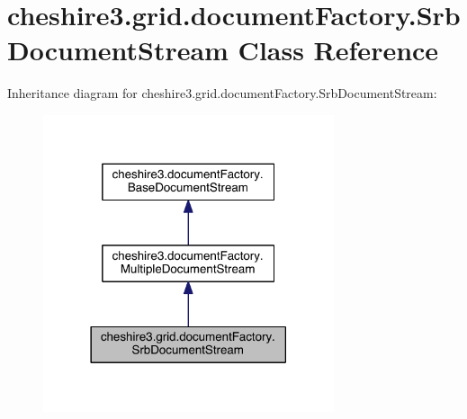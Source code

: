 \hypertarget{classcheshire3_1_1grid_1_1document_factory_1_1_srb_document_stream}{\section{cheshire3.\-grid.\-document\-Factory.\-Srb\-Document\-Stream Class Reference}
\label{classcheshire3_1_1grid_1_1document_factory_1_1_srb_document_stream}
}


Inheritance diagram for cheshire3.\-grid.\-document\-Factory.\-Srb\-Document\-Stream\-:
\nopagebreak
\begin{figure}[H]
\begin{center}
\leavevmode
\includegraphics[width=242pt]{classcheshire3_1_1grid_1_1document_factory_1_1_srb_document_stream__inherit__graph}
\end{center}
\end{figure}



